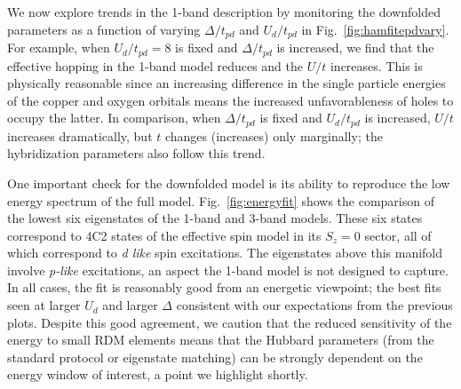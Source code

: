 We now explore trends in the 1-band description by monitoring the downfolded parameters as a function 
of varying $\Delta/t_{pd}$ and $U_d/t_{pd}$ in Fig.~\ref{fig:hamfitepdvary}. For example, 
when $U_d/t_{pd}=8$ is fixed and $\Delta/t_{pd}$ is increased, we find that the effective 
hopping in the 1-band model reduces and the $U/t$ increases. 
This is physically reasonable since an increasing difference in the single particle energies of the copper and oxygen orbitals 
means the increased unfavorableness of holes to occupy the latter. 
In comparison, when $\Delta/t_{pd}$ is fixed and $U_d/t_{pd}$ is increased, $U/t$ increases dramatically, 
but $t$ changes (increases) only marginally; the hybridization parameters also follow this trend. 

One important check for the downfolded model is its ability to reproduce the low energy spectrum of 
the full model. Fig.~\ref{fig:energyfit} shows the comparison of the lowest six eigenstates of the 
1-band and 3-band models. These six states correspond to 4C2 states of the effective spin model 
in its $S_z=0$ sector, all of which correspond to \textit{d like} spin excitations. 
The eigenstates above this manifold involve \textit{p-like} excitations, an aspect the 1-band model is not designed to capture. 
In all cases, the fit is reasonably good from an energetic viewpoint; the best fits seen at larger 
$U_d$ and larger $\Delta$ consistent with our expectations from the previous plots. Despite this good agreement, 
we caution that the reduced sensitivity of the energy to small RDM elements means 
that the Hubbard parameters (from the standard protocol or eigenstate matching) 
can be strongly dependent on the energy window of interest, a point we highlight shortly. 
